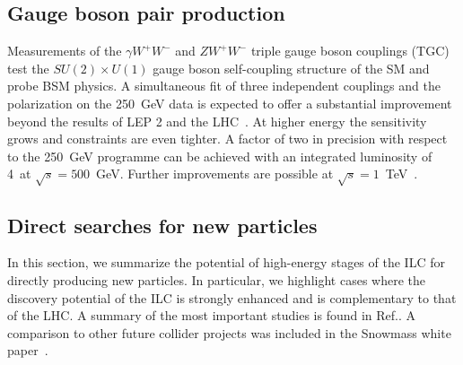 \subsection{Gauge boson pair production}
\label{subsec:highE:gauge}


Measurements of the $\gamma W^+W^-$ and $ZW^+W^-$ triple gauge boson couplings (TGC) test the $SU(2) \times U(1)$
gauge boson self-coupling structure of the SM and probe BSM physics. A simultaneous fit of three independent couplings and
the polarization on the 250~GeV{} data is expected to offer a substantial improvement beyond the results of LEP 2 and the
LHC~\cite{Fujii:2017vwa}. At higher energy the sensitivity grows and constraints are even tighter. A factor of two in
precision\cite{Marchesini:2011aka} with respect to the 250~GeV{} programme can be achieved with an integrated
luminosity of 4~\iab at $\sqrt{s}=500$~GeV. Further improvements are possible at   $\sqrt{s}=1$~TeV~\cite{Rosca:2016hcq}.



\subsection{Direct searches for new particles}
\label{subsec:highE:searches}

In this section, we summarize the potential of high-energy stages of the ILC for directly producing
new particles. In particular, we highlight cases where the discovery potential of the ILC is strongly enhanced and
is complementary to that of the LHC. A summary of the most important studies is found in Ref.\cite{Fujii:2017ekh}.
A comparison to other future collider projects was included in the Snowmass white paper~\cite{Baer:2013vqa}. 




